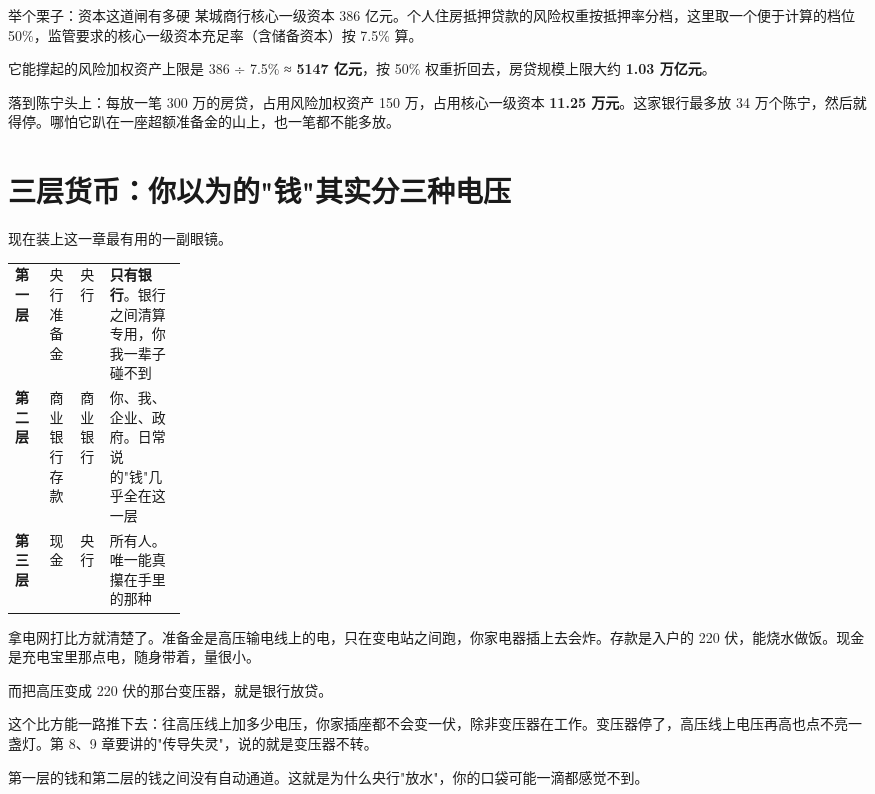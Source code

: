 \begin{egbox}{举个栗子：资本这道闸有多硬}
某城商行核心一级资本 386 亿元。个人住房抵押贷款的风险权重按抵押率分档，这里取一个便于计算的档位 50\%，监管要求的核心一级资本充足率（含储备资本）按 7.5\% 算。

它能撑起的风险加权资产上限是 386 ÷ 7.5\% ≈ \textbf{5147 亿元}，按 50\% 权重折回去，房贷规模上限大约 \textbf{1.03 万亿元}。

落到陈宁头上：每放一笔 300 万的房贷，占用风险加权资产 150 万，占用核心一级资本 \textbf{11.25 万元}。这家银行最多放 34 万个陈宁，然后就得停。哪怕它趴在一座超额准备金的山上，也一笔都不能多放。

\end{egbox}

\section{三层货币：你以为的"钱"其实分三种电压}

现在装上这一章最有用的一副眼镜。

\begin{tablewrap}
\begin{xltabular}{\linewidth}{>{\raggedright\arraybackslash}p{0.20\linewidth}XXX}
\toprule
{} &  &  &  \\
\midrule
\textbf{第一层} & 央行准备金 & 央行 & \textbf{只有银行}。银行之间清算专用，你我一辈子碰不到 \\
\textbf{第二层} & 商业银行存款 & 商业银行 & 你、我、企业、政府。日常说的"钱"几乎全在这一层 \\
\textbf{第三层} & 现金 & 央行 & 所有人。唯一能真攥在手里的那种 \\
\bottomrule
\end{xltabular}
\end{tablewrap}

拿电网打比方就清楚了。准备金是高压输电线上的电，只在变电站之间跑，你家电器插上去会炸。存款是入户的 220 伏，能烧水做饭。现金是充电宝里那点电，随身带着，量很小。

而把高压变成 220 伏的那台变压器，就是银行放贷。

这个比方能一路推下去：往高压线上加多少电压，你家插座都不会变一伏，除非变压器在工作。变压器停了，高压线上电压再高也点不亮一盏灯。第 8、9 章要讲的"传导失灵"，说的就是变压器不转。

\begin{pullquote}{}
第一层的钱和第二层的钱之间没有自动通道。这就是为什么央行"放水"，你的口袋可能一滴都感觉不到。
\end{pullquote}

